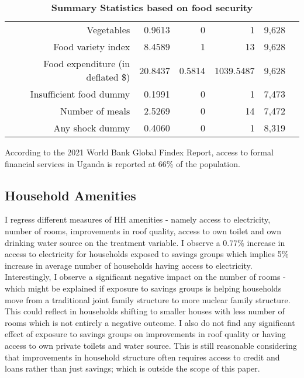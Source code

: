 \begin{table}[!h]
\begin{tabular}{llllll}
\multicolumn{1}{|r}{Vegetables} &
  \multicolumn{1}{|r}{0.9613} &
  \multicolumn{1}{|r}{0} &
  \multicolumn{1}{|r}{1} &
  \multicolumn{1}{|r|}{9,628} \\
\multicolumn{1}{|r}{Food variety index} &
  \multicolumn{1}{|r}{8.4589} &
  \multicolumn{1}{|r}{1} &
  \multicolumn{1}{|r}{13} &
  \multicolumn{1}{|r|}{9,628} \\
\multicolumn{1}{|r}{Food expenditure (in deflated \$)} &
  \multicolumn{1}{|r}{20.8437} &
  \multicolumn{1}{|r}{0.5814} &
  \multicolumn{1}{|r}{1039.5487} &
  \multicolumn{1}{|r|}{9,628} \\
\multicolumn{1}{|r}{Insufficient food dummy} &
  \multicolumn{1}{|r}{0.1991} &
  \multicolumn{1}{|r}{0} &
  \multicolumn{1}{|r}{1} &
  \multicolumn{1}{|r|}{7,473}  \\
\multicolumn{1}{|r}{Number of meals} &
  \multicolumn{1}{|r}{2.5269} &
  \multicolumn{1}{|r}{0} &
  \multicolumn{1}{|r}{14} &
  \multicolumn{1}{|r|}{7,472}  \\
\multicolumn{1}{|r}{Any shock dummy} &
  \multicolumn{1}{|r}{0.4060} &
  \multicolumn{1}{|r}{0} &
  \multicolumn{1}{|r}{1} &
  \multicolumn{1}{|r|}{8,319}\\
\cline{1-5}
\end{tabular}
\caption{\bfseries Summary Statistics based on food security}
\end{table}

According to the 2021 World Bank Global Findex Report, access to formal financial services in Uganda is reported at 66\% of the population. 



\subsection{Household Amenities}\label{sec:regression analysis and results}

\hspace{1cm} I regress different measures of HH amenities - namely access to electricity, number of rooms, improvements in roof quality, access to own toilet and own drinking water source on the treatment variable. I observe a 0.77\% increase in access to electricity for households exposed to savings groups which implies 5\% increase in average number of households having access to electricity. Interestingly, I observe a significant negative impact on the number of rooms - which might be explained if exposure to savings groups is helping households move from a traditional joint family structure to more nuclear family structure. This could reflect in households shifting to smaller houses with less number of rooms which is not entirely a negative outcome. I also do not find any significant effect of exposure to savings groups on improvements in roof quality or having access to own private toilets and water source. This is still reasonable considering that improvements in household structure often requires access to credit and loans rather than just savings; which is outside the scope of this paper.

